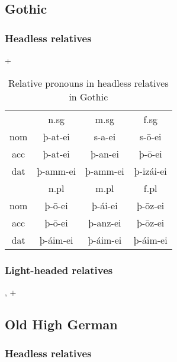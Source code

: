 \subsection{Gothic}

\subsubsection{Headless relatives}

 + 

\begin{table}[H]
	\center
	\caption {Relative pronouns in headless relatives in Gothic}
		\begin{tabular}{cccc}
		\toprule
							& \ac{n}.\ac{sg} 	& \ac{m}.\ac{sg}	& \ac{f}.\ac{sg}  \\
		 						\cmidrule{2-4}
    \ac{nom} 	& þ-at-ei 	 			& s-a-ei 					& s-ō-ei					\\
    \ac{acc}	& þ-at-ei    			& þ-an-ei  				& þ-ō-ei  				\\
    \ac{dat} 	& þ-amm-ei 				& þ-amm-ei				& þ-izái-ei 			\\
		\bottomrule
    					& \ac{n}.\ac{pl}	& \ac{m}.\ac{pl}	& \ac{f}.\ac{pl}	\\
						    \cmidrule{2-4}
    \ac{nom} 	& þ-ō-ei					&	þ-ái-ei					&	þ-ōz-ei					\\
    \ac{acc} 	& þ-ō-ei 					&	þ-anz-ei				&	þ-ōz-ei					\\
    \ac{dat} 	& þ-áim-ei				&	þ-áim-ei 				&	þ-áim-ei 				\\
    \bottomrule
		\end{tabular}
\end{table}

\subsubsection{Light-headed relatives}

,  + 



\subsection{Old High German}

\subsubsection{Headless relatives}


